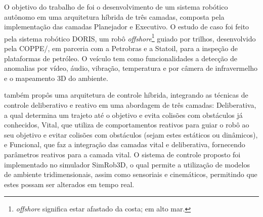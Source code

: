 
O objetivo do trabalho de  foi o desenvolvimento de um sistema robótico autônomo em uma 
arquitetura híbrida de três camadas, composta pela implementação das camadas Planejador e Executivo. 
O estudo de caso foi feito pela sistema robótico DORIS, um robô \textit{offshore}\footnote{\textit{offshore} 
significa estar afastado da costa; em alto mar.} 
guiado por trilhos, desenvolvido pela COPPE/, 
em parceria com a Petrobras e a Statoil, para a inspeção de plataformas de petróleo. O veículo 
tem como funcionalidades a detecção de anomalias por vídeo, áudio, vibração, temperatura e por câmera de infravermelho e o 
mapeamento 3D do ambiente.

 também propôs uma arquitetura de controle híbrida, integrando as técnicas de controle deliberativo e 
reativo em uma abordagem de três camadas: Deliberativa, a qual determina um trajeto até o objetivo e evita colisões com obstáculos 
já conhecidos, Vital, que utiliza de comportamentos reativos para guiar o robô ao seu objetivo e evitar colisões com obstáculos 
(sejam estes estáticos ou dinâmicos), e Funcional, que faz a integração das camadas vital e deliberativa, fornecendo parâmetros 
reativos para a camada vital. O sistema de controle proposto foi implementado no simulador SimRob3D, o qual permite a utilização de 
modelos de ambiente 
tridimensionais, assim como sensoriais e cinemáticos, permitindo que estes possam ser alterados em tempo real.


